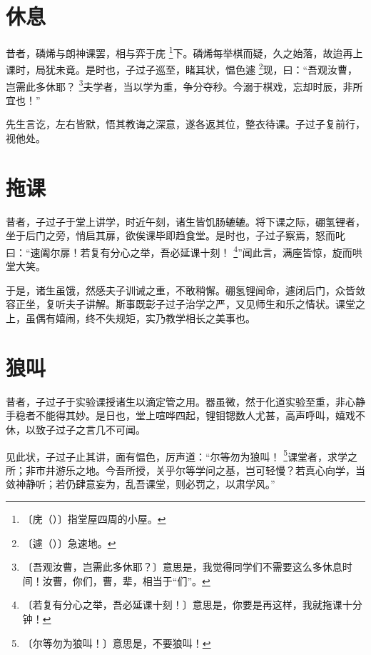 \documentclass[b5paper,zihao=-4]{ctexbook}
\newcommand{\zhushi}[2]{#1 \footnote{〔#1〕#2}}
\newcommand{\zhushipy}[3]{#1 \footnote{〔#2〕#3}}
\begin{document}
\tableofcontents
\label{mulu}

\titleformat{\chapter}{\centering\normalfont\huge\bfseries\color{titlecolor}}{}{0pt}{}
\mainmatter
\chapter[休息]{休息\protect\color[RGB]{0,0,0}\raisebox{0.3em}{\footnotemark}}

昔者，磷烯与朗神课罢，相与弈于\zhushipy{庑}{庑（）}{指堂屋四周的小屋。}下。磷烯每举棋而疑，久之始落，故迨再上课时，局犹未竟。是时也，子过子巡至，睹其状，愠色\zhushipy{遽}{遽（）}{急速地。}现，曰：“\zhushi{吾观汝曹，岂需此多休耶？}{意思是，我觉得同学们不需要这么多休息时间！汝曹，你们，曹，辈，相当于“们”。}夫学者，当以学为重，争分夺秒。今溺于棋戏，忘却时辰，非所宜也！”

先生言讫，左右皆默，悟其教诲之深意，遂各返其位，整衣待课。子过子复前行，视他处。

\chapter{拖课}

昔者，子过子于堂上讲学，时近午刻，诸生皆饥肠辘辘。将下课之际，硼氢锂者，坐于后门之旁，悄启其扉，欲俟课毕即趋食堂。是时也，子过子察焉，怒而叱曰：“速阖尔扉！\zhushi{若复有分心之举，吾必延课十刻！}{意思是，你要是再这样，我就拖课十分钟！}”闻此言，满座皆惊，旋而哄堂大笑。

于是，诸生虽饿，然感夫子训诫之重，不敢稍懈。硼氢锂闻命，遽闭后门，众皆敛容正坐，复听夫子讲解。斯事既彰子过子治学之严，又见师生和乐之情状。课堂之上，虽偶有嬉闹，终不失规矩，实乃教学相长之美事也。

\chapter{狼叫}

昔者，子过子于实验课授诸生以滴定管之用。器虽微，然于化道实验至重，非心静手稳者不能得其妙。是日也，堂上喧哗四起，锂钼锶数人尤甚，高声呼叫，嬉戏不休，以致子过子之言几不可闻。

见此状，子过子止其讲，面有愠色，厉声道：“\zhushi{尔等勿为狼叫！}{意思是，不要狼叫！}课堂者，求学之所；非市井游乐之地。今吾所授，关乎尔等学问之基，岂可轻慢？若真心向学，当敛神静听；若仍肆意妄为，乱吾课堂，则必罚之，以肃学风。”
\end{document}

